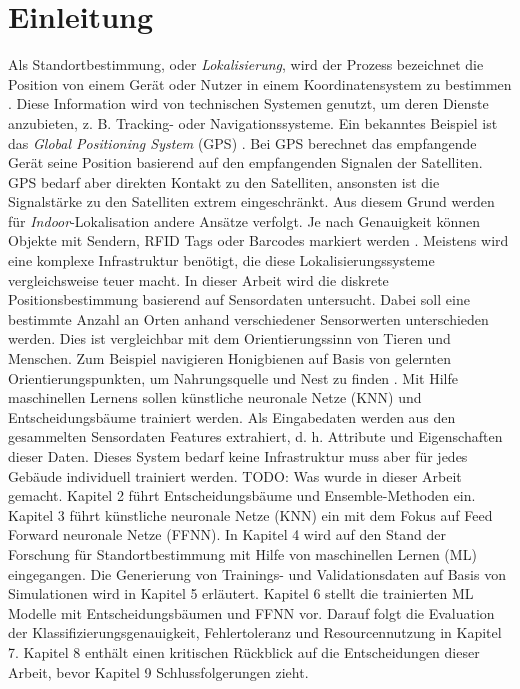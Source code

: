 \chapter{Einleitung}
Als Standortbestimmung, oder \textit{Lokalisierung}, wird der Prozess bezeichnet die Position von einem Gerät oder Nutzer in einem Koordinatensystem zu bestimmen \cite{bulusu2000gps}.
Diese Information wird von technischen Systemen genutzt, um deren Dienste anzubieten, z. B. Tracking- oder Navigationssysteme.
Ein bekanntes Beispiel ist das \textit{Global Positioning System} (GPS) \cite{kaplan2005understanding}.
Bei GPS berechnet das empfangende Gerät seine Position basierend auf den empfangenden Signalen der Satelliten.
\newline
\newline
GPS bedarf aber direkten Kontakt zu den Satelliten, ansonsten ist die Signalstärke zu den Satelliten extrem eingeschränkt.
Aus diesem Grund werden für \textit{Indoor}-Lokalisation andere Ansätze verfolgt.
Je nach Genauigkeit können Objekte mit Sendern, RFID Tags oder Barcodes markiert werden \cite{xiao2016survey}.
Meistens wird eine komplexe Infrastruktur benötigt, die diese Lokalisierungssysteme vergleichsweise teuer macht.
\newline
\newline
In dieser Arbeit wird die diskrete Positionsbestimmung basierend auf Sensordaten untersucht.
Dabei soll eine bestimmte Anzahl an Orten anhand verschiedener Sensorwerten unterschieden werden.
Dies ist vergleichbar mit dem Orientierungssinn von Tieren und Menschen.
Zum Beispiel navigieren Honigbienen auf Basis von gelernten Orientierungspunkten, um Nahrungsquelle und Nest zu finden \cite{menzel1996knowledge}.
Mit Hilfe maschinellen Lernens sollen künstliche neuronale Netze (KNN) und Entscheidungsbäume trainiert werden.
Als Eingabedaten werden aus den gesammelten Sensordaten Features extrahiert, d. h. Attribute und Eigenschaften dieser Daten.
Dieses System bedarf keine Infrastruktur muss aber für jedes Gebäude individuell trainiert werden.
\newline
\newline
TODO: Was wurde in dieser Arbeit gemacht.
\newline
\newline
Kapitel 2 führt Entscheidungsbäume und Ensemble-Methoden ein.
Kapitel 3 führt künstliche neuronale Netze (KNN) ein mit dem Fokus auf Feed Forward neuronale Netze (FFNN).
In Kapitel 4 wird auf den Stand der Forschung für Standortbestimmung mit Hilfe von maschinellen Lernen (ML) eingegangen.
Die Generierung von Trainings- und Validationsdaten auf Basis von Simulationen wird in Kapitel 5 erläutert.
Kapitel 6 stellt die trainierten ML Modelle mit Entscheidungsbäumen und FFNN vor.
Darauf folgt die Evaluation der Klassifizierungsgenauigkeit, Fehlertoleranz und Resourcennutzung in Kapitel 7.
Kapitel 8 enthält einen kritischen Rückblick auf die Entscheidungen dieser Arbeit, bevor Kapitel 9 Schlussfolgerungen zieht.